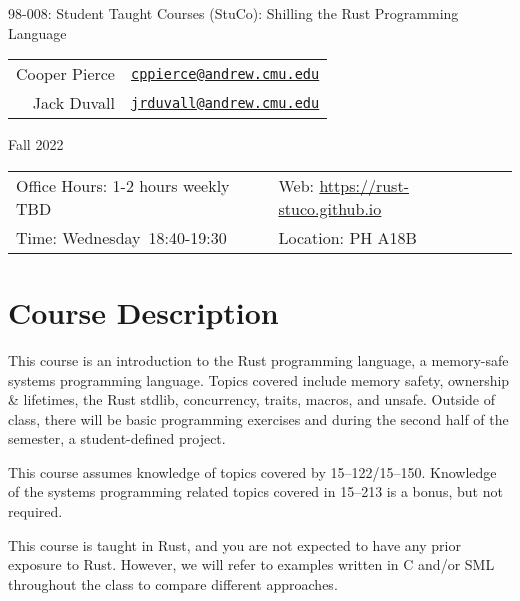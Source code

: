 \documentclass{article}
\newcommand{\longcoursename}{
    Student Taught Courses (StuCo): Shilling the Rust Programming Language
}
\newcommand{\courselocation}{PH A18B}
\newcommand{\meetingstarttime}{18:40}
\newcommand{\meetingendtime}{19:30}
\newcommand{\meetingdays}{Wednesday}
\newcommand{\longsemester}{Fall 2022}
\newcommand{\deptcode}{98}
\newcommand{\coursecode}{008}
\newcommand{\fullcoursecode}{\deptcode-\coursecode}
\begin{document}
\thispagestyle{empty}
\begin{center}
\begin{minipage}{.85\textwidth}
    \centering
    {\huge {\fullcoursecode: \longcoursename}}

    \vspace{1em}

    \begin{tabular}{@{}rl@{}}
        Cooper Pierce & \href{mailto:cppierce@andrew.cmu.edu}{\texttt{cppierce@andrew.cmu.edu}} \\ 
        Jack Duvall & \href{mailto:jrduvall@andrew.cmu.edu}{\texttt{jrduvall@andrew.cmu.edu}} \\
    \end{tabular}

    \vspace{1em}

    \longsemester
\end{minipage}
\end{center}

\vspace{3em}


\begin{tabular*}{.93\textwidth}{@{\extracolsep{\fill}}ll}
    \toprule
    Office Hours: 1-2 hours weekly TBD & Web: \url{https://rust-stuco.github.io} \\
    Time: \meetingdays\ \meetingstarttime-\meetingendtime & Location: \courselocation \\
    \bottomrule
\end{tabular*}

\vspace{5em}

\section*{Course Description}

This course is an introduction to the Rust programming language, a memory-safe
systems programming language. Topics covered include memory safety, ownership \&
lifetimes, the Rust stdlib, concurrency, traits, macros, and unsafe. Outside of
class, there will be basic programming exercises and during the second half of
the semester, a student-defined project.

This course assumes knowledge of topics covered by 15--122/15--150. Knowledge of
the systems programming related topics covered in 15--213 is a bonus, but not
required.

This course is taught in Rust, and you are not expected to have any prior
exposure to Rust. However, we will refer to examples written in C and/or SML
throughout the class to compare different approaches.
\end{document}
